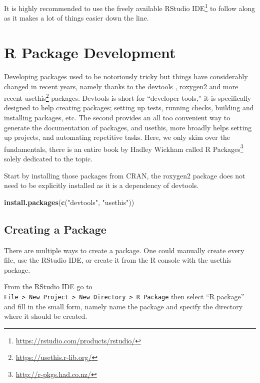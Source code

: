 \documentclass[
  10pt,
]{krantz}
\makeatletter
\newenvironment{Shaded}{\begin{snugshade}}{\end{snugshade}}
\newcommand{\KeywordTok}[1]{\textcolor[rgb]{0.27,0.27,0.27}{\textbf{#1}}}
\newcommand{\NormalTok}[1]{#1}
\newcommand{\StringTok}[1]{\textcolor[rgb]{0.5,0.5,0.5}{#1}}
\renewcommand{\href}[2]{#2\footnote{\url{#1}}}
\newenvironment{kframe}{%
\medskip{}
\setlength{\fboxsep}{.8em}
 \def\at@end@of@kframe{}%
 \ifinner\ifhmode%
  \def\at@end@of@kframe{\end{minipage}}%
  \begin{minipage}{\columnwidth}%
 \fi\fi%
 \def\FrameCommand##1{\hskip\@totalleftmargin \hskip-\fboxsep
 \colorbox{shadecolor}{##1}\hskip-\fboxsep
     \hskip-\linewidth \hskip-\@totalleftmargin \hskip\columnwidth}%
 \MakeFramed {\advance\hsize-\width
   \@totalleftmargin\z@ \linewidth\hsize
   \@setminipage}}%
 {\par\unskip\endMakeFramed%
 \at@end@of@kframe}
\renewenvironment{Shaded}{\begin{kframe}}{\end{kframe}}
\makeatother
\begin{document}
It is highly recommended to use the freely available \href{https://rstudio.com/products/rstudio/}{RStudio IDE} to follow along as it makes a lot of things easier down the line.

\hypertarget{basics-package-dev}{%
\section{R Package Development}\label{basics-package-dev}}

Developing packages used to be notoriously tricky but things have considerably changed in recent years, namely thanks to the devtools \citep{R-devtools}, roxygen2 \citep{R-roxygen2} and more recent \href{https://usethis.r-lib.org/}{usethis} \citep{R-usethis} packages. Devtools is short for ``developer tools,'' it is specifically designed to help creating packages; setting up tests, running checks, building and installing packages, etc. The second provides an all too convenient way to generate the documentation of packages, and usethis, more broadly helps setting up projects, and automating repetitive tasks. Here, we only skim over the fundamentals, there is an entire book by Hadley Wickham called \href{http://r-pkgs.had.co.nz/}{R Packages} solely dedicated to the topic.

Start by installing those packages from CRAN, the roxygen2 package does not need to be explicitly installed as it is a dependency of devtools.

\begin{Shaded}
\begin{Highlighting}[]
\KeywordTok{install.packages}\NormalTok{(}\KeywordTok{c}\NormalTok{(}\StringTok{"devtools"}\NormalTok{, }\StringTok{"usethis"}\NormalTok{))}
\end{Highlighting}
\end{Shaded}

\hypertarget{basics-create-pkg}{%
\subsection{Creating a Package}\label{basics-create-pkg}}

There are multiple ways to create a package. One could manually create every file, use the RStudio IDE, or create it from the R console with the usethis \citep{R-usethis} package.

From the RStudio IDE go to \texttt{File\ \textgreater{}\ New\ Project\ \textgreater{}\ New\ Directory\ \textgreater{}\ R\ Package} then select ``R package'' and fill in the small form, namely name the package and specify the directory where it should be created.
\end{document}
